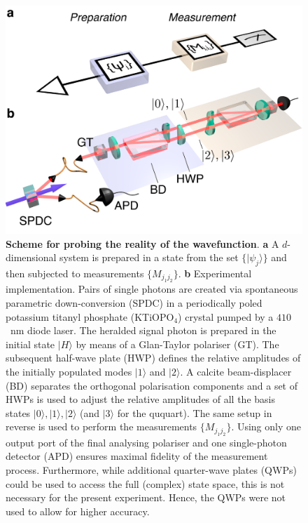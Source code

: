 \documentclass[aps,prl,floatfix,twocolumn,tightenlines,amsmath,amssymb,nofootinbib]{revtex4-1}
\newcommand{\ket}[1] {| #1 \rangle}
\begin{document}
\begin{figure}[h!]
\begin{center}
\includegraphics[width=\columnwidth]{Figure_2.pdf}
\end{center}
\vspace{-1.5em}
\caption{\textbf{Scheme for probing the reality of the wavefunction}. \textbf{a} A $d$-dimensional system is prepared in a state from the set $\{\ket{\psi_{j}}\}$ and then subjected to measurements $\{M_{j_1j_2}\}$.
\textbf{b} Experimental implementation. Pairs of single photons are created via spontaneous parametric down-conversion (SPDC) in a periodically poled potassium titanyl phosphate (KTiOPO$_4$) crystal pumped by a $410$~nm diode laser\cite{Fedrizzi2007a}. The heralded signal photon is prepared in the initial state $\ket{H}$ by means of a Glan-Taylor polariser (GT). The subsequent half-wave plate (HWP) defines the relative amplitudes of the initially populated modes $\ket{1}$ and $\ket{2}$. A calcite beam-displacer (BD) separates the orthogonal polarisation components and a set of HWPs is used to adjust the relative amplitudes of all the basis states $\ket{0}, \ket{1}, \ket{2}$ (and $\ket 3$ for the ququart). The same setup in reverse is used to perform the measurements $\{M_{j_1j_2}\}$. Using only one output port of the final analysing polariser and one single-photon detector (APD) ensures maximal fidelity of the measurement process. Furthermore, while additional quarter-wave plates (QWPs) could be used to access the full (complex) state space, this is not necessary for the present experiment. Hence, the QWPs were not used to allow for higher accuracy.}
  \label{fig:Setup}
\end{figure}
\end{document}

